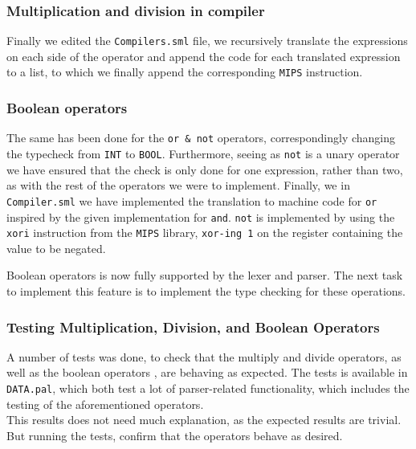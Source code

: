 \documentclass[10pt]{article}
\begin{document}
\subsubsection{Multiplication and division in compiler}
Finally we edited the \texttt{Compilers.sml} file, we recursively translate the expressions on each side of the operator and append the code for each translated expression to a list, to which we finally append the corresponding \texttt{MIPS} instruction.

\subsubsection{Boolean operators}
The same has been done for the \texttt{or \& not} operators, correspondingly changing the typecheck from \texttt{INT} to \texttt{BOOL}. Furthermore, seeing as \texttt{not} is a unary operator we have ensured that the check is only done for one expression, rather than two, as with the rest of the operators we were to implement. Finally, we in \texttt{Compiler.sml} we have implemented the translation to machine code for \texttt{or} inspired by the given implementation for \texttt{and}. \texttt{not} is implemented by using the \texttt{xori} instruction from the \texttt{MIPS} library, \texttt{xor-ing 1} on the register containing the value to be negated.

Boolean operators is now fully supported by the lexer and parser. The next task to implement this feature is to implement the type checking for these operations.

\subsubsection{Testing Multiplication, Division, and Boolean Operators}
A number of tests was done, to check that the multiply and divide operators, as well as the boolean operators , are behaving as expected. The tests is available in \texttt{DATA\parserTest.pal}, which both test a lot of parser-related functionality, which includes the testing of the aforementioned operators.\\ This results does not need much explanation, as the expected results are trivial. But running the tests, confirm that the operators behave as desired.
\end{document}
